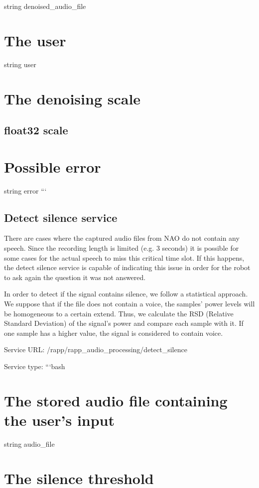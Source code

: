 string denoised\-\_\-audio\-\_\-file \section*{The user}

string user \section*{The denoising scale}

\subsection*{float32 scale }

\section*{Possible error}

string error ``` \subsection*{Detect silence service}

There are cases where the captured audio files from N\-A\-O do not contain any speech. Since the recording length is limited (e.\-g. 3 seconds) it is possible for some cases for the actual speech to miss this critical time slot. If this happens, the detect silence service is capable of indicating this issue in order for the robot to ask again the question it was not answered.

In order to detect if the signal contains silence, we follow a statistical approach. We suppose that if the file does not contain a voice, the samples’ power levels will be homogeneous to a certain extend. Thus, we calculate the R\-S\-D (Relative Standard Deviation) of the signal’s power and compare each sample with it. If one sample has a higher value, the signal is considered to contain voice.

Service U\-R\-L\-: {\ttfamily /rapp/rapp\-\_\-audio\-\_\-processing/detect\-\_\-silence}

Service type\-: ```bash \section*{The stored audio file containing the user’s input}

string audio\-\_\-file \section*{The silence threshold}

